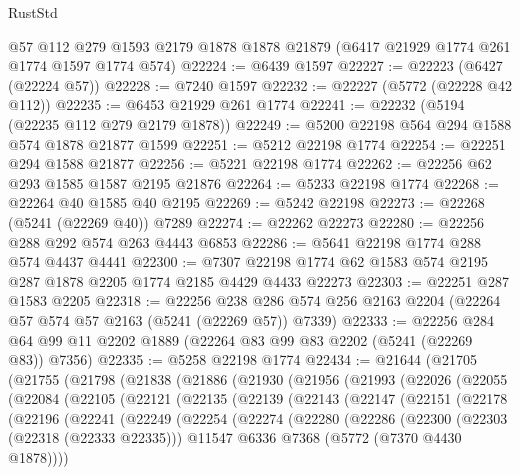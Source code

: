 \begin{lexlean}{RustStd}
\begin{coremodule}
    @57
    @112
    @279
    @1593
    @2179
    @1878
    @1878
    @21879
    (@6417 @21929 @1774 @261 @1774 @1597 @1774 @574)
@22224 := @6439 @1597
@22227 := @22223 (@6427 (@22224 @57))
@22228 := @7240 @1597
@22232 := @22227 (@5772 (@22228 @42 @112))
@22235 := @6453 @21929 @261 @1774
@22241 := @22232 (@5194 (@22235 @112 @279 @2179 @1878))
@22249 := @5200 @22198 @564 @294 @1588 @574 @1878 @21877 @1599
@22251 := @5212 @22198 @1774
@22254 := @22251 @294 @1588 @21877
@22256 := @5221 @22198 @1774
@22262 := @22256 @62 @293 @1585 @1587 @2195 @21876
@22264 := @5233 @22198 @1774
@22268 := @22264 @40 @1585 @40 @2195
@22269 := @5242 @22198
@22273 := @22268 (@5241 (@22269 @40)) @7289
@22274 := @22262 @22273
@22280 := @22256 @288 @292 @574 @263 @4443 @6853
@22286 := @5641 @22198 @1774 @288 @574 @4437 @4441
@22300 := @7307 @22198 @1774 @62 @1583 @574 @2195 @287 @1878 @2205 @1774 @2185 @4429 @4433 @22273
@22303 := @22251 @287 @1583 @2205
@22318 := @22256
    @238
    @286
    @574
    @256
    @2163
    @2204
    (@22264 @57 @574 @57 @2163 (@5241 (@22269 @57)) @7339)
@22333 := @22256 @284 @64 @99 @11 @2202 @1889 (@22264 @83 @99 @83 @2202 (@5241 (@22269 @83)) @7356)
@22335 := @5258 @22198 @1774
@22434 := @21644
    (@21705
      (@21755
        (@21798
          (@21838
            (@21886
              (@21930
                (@21956
                  (@21993
                    (@22026
                      (@22055
                        (@22084
                          (@22105
                            (@22121
                              (@22135
                                (@22139
                                  (@22143
                                    (@22147
                                      (@22151
                                        (@22178
                                          (@22196
                                            (@22241
                                              (@22249
                                                (@22254
                                                  (@22274
                                                    (@22280
                                                      (@22286
                                                        (@22300
                                                          (@22303 (@22318 (@22333 @22335)))
                                                          @11547
                                                          @6336
                                                          @7368
                                                          (@5772 (@7370 @4430 @1878))))

\end{coremodule}
\end{lexlean}
